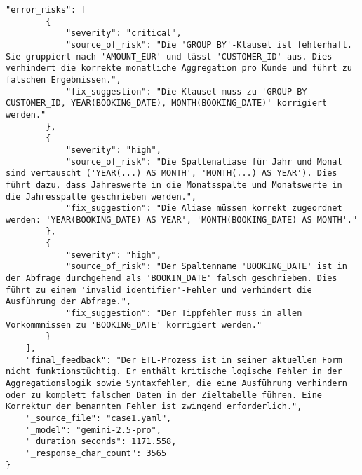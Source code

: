 \begin{lstlisting}[caption={Ausgabe: Gemini 2.5 Pro Anwendungsfall 1 Hauptdurchlauf},label={gemini_case1_prompt1}]
    "error_risks": [
        {
            "severity": "critical",
            "source_of_risk": "Die 'GROUP BY'-Klausel ist fehlerhaft. Sie gruppiert nach 'AMOUNT_EUR' und lässt 'CUSTOMER_ID' aus. Dies verhindert die korrekte monatliche Aggregation pro Kunde und führt zu falschen Ergebnissen.",
            "fix_suggestion": "Die Klausel muss zu 'GROUP BY CUSTOMER_ID, YEAR(BOOKING_DATE), MONTH(BOOKING_DATE)' korrigiert werden."
        },
        {
            "severity": "high",
            "source_of_risk": "Die Spaltenaliase für Jahr und Monat sind vertauscht ('YEAR(...) AS MONTH', 'MONTH(...) AS YEAR'). Dies führt dazu, dass Jahreswerte in die Monatsspalte und Monatswerte in die Jahresspalte geschrieben werden.",
            "fix_suggestion": "Die Aliase müssen korrekt zugeordnet werden: 'YEAR(BOOKING_DATE) AS YEAR', 'MONTH(BOOKING_DATE) AS MONTH'."
        },
        {
            "severity": "high",
            "source_of_risk": "Der Spaltenname 'BOOKING_DATE' ist in der Abfrage durchgehend als 'BOOKIN_DATE' falsch geschrieben. Dies führt zu einem 'invalid identifier'-Fehler und verhindert die Ausführung der Abfrage.",
            "fix_suggestion": "Der Tippfehler muss in allen Vorkommnissen zu 'BOOKING_DATE' korrigiert werden."
        }
    ],
    "final_feedback": "Der ETL-Prozess ist in seiner aktuellen Form nicht funktionstüchtig. Er enthält kritische logische Fehler in der Aggregationslogik sowie Syntaxfehler, die eine Ausführung verhindern oder zu komplett falschen Daten in der Zieltabelle führen. Eine Korrektur der benannten Fehler ist zwingend erforderlich.",
    "_source_file": "case1.yaml",
    "_model": "gemini-2.5-pro",
    "_duration_seconds": 1171.558,
    "_response_char_count": 3565
}
\end{lstlisting}

